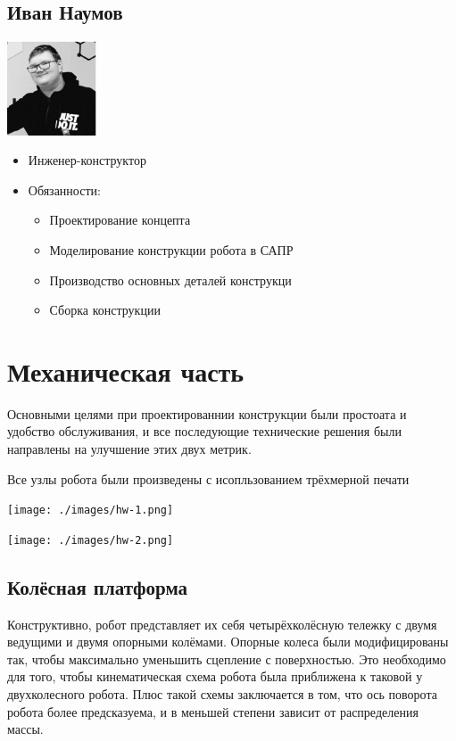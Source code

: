 \documentclass[11pt]{article}
\begin{document}
\subsection{Иван Наумов}
\label{sec:orgd69d41a}
\begin{center}
\includegraphics[width=100]{./images/ivan.jpg}
\end{center}
\begin{itemize}
\item Инженер-конструктор
\item Обязанности:
\begin{itemize}
\item Проектирование концепта
\item Моделирование конструкции робота в САПР
\item Производство основных деталей конструкци
\item Сборка конструкции
\end{itemize}
\end{itemize}
\section{Механическая часть}
\label{sec:org232a892}
Основными целями при проектированнии конструкции были простоата и удобство обслуживания, и все последующие технические решения были направлены на улучшение этих двух метрик.

Все узлы робота были произведены с исопльзованием трёхмерной печати

\begin{center}
\texttt{[image: ./images/hw-1.png]}
\end{center}
\begin{center}
\texttt{[image: ./images/hw-2.png]}
\end{center}

\subsection{Колёсная платформа}
\label{sec:orgbaa6b48}
Конструктивно, робот представляет их себя четырёхколёсную тележку с двумя ведущими и двумя опорными колёмами. Опорные колеса были модифицированы так, чтобы максимально уменьшить сцепление с поверхностью. Это необходимо для того, чтобы кинематическая схема робота была приближена к таковой у двухколесного робота. Плюс такой схемы заключается в том, что ось поворота робота более предсказуема, и в меньшей степени зависит от распределения массы.
\end{document}

